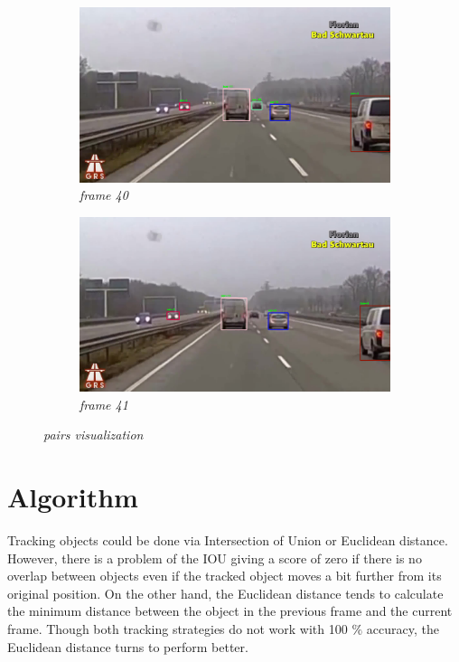 \documentclass[11pt,a4paper]{article}
\begin{document}
\begin{figure}[!h]
\begin{subfigure}[b]{0.48\textwidth}
\includegraphics[width=\textwidth]{40}
\caption{\textit{frame 40}}
\end{subfigure}
\label{fig:end_0}
\hfill
\begin{subfigure}[b]{0.48\textwidth}
\includegraphics[width=\textwidth]{41}
\caption{\textit{frame 41}}
\end{subfigure}
\label{fig:end_1}
\caption{\textit{pairs visualization}}
\label{fig:tracked objects}
\end{figure}

 

\section{Algorithm} Tracking objects could be done via Intersection of Union or Euclidean distance. However, there is a problem of the IOU giving a  score of zero if there is no overlap between objects even if the tracked object moves a bit further from its original position. On the other hand, the Euclidean distance tends to calculate the minimum distance between the object in the previous frame and the current frame. Though both tracking strategies do not work with 100 $\%$ accuracy, the Euclidean distance turns to perform better. \\
\end{document}
